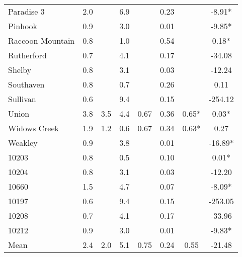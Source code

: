 \begin{tabular}{l c c c c c c c}
Paradise 3 & 2.0 &  & 6.9 &  & 0.23 &  & -8.91* \\
Pinhook & 0.9 &  & 3.0 &  & 0.01 &  & -9.85* \\
Raccoon Mountain & 0.8 &  & 1.0 &  & 0.54 &  & 0.18* \\
Rutherford & 0.7 &  & 4.1 &  & 0.17 &  & -34.08 \\
Shelby & 0.8 &  & 3.1 &  & 0.03 &  & -12.24 \\
Southaven & 0.8 &  & 0.7 &  & 0.26 &  & 0.11 \\
Sullivan & 0.6 &  & 9.4 &  & 0.15 &  & -254.12 \\
Union & 3.8 & 3.5 & 4.4 & 0.67 & 0.36 & 0.65* & 0.03* \\
Widows Creek & 1.9 & 1.2 & 0.6 & 0.67 & 0.34 & 0.63* & 0.27 \\
Weakley & 0.9 &  & 3.8 &  & 0.01 &  & -16.89* \\
10203 & 0.8 &  & 0.5 &  & 0.10 &  & 0.01* \\
10204 & 0.8 &  & 3.1 &  & 0.03 &  & -12.20 \\
10660 & 1.5 &  & 4.7 &  & 0.07 &  & -8.09* \\
10197 & 0.6 &  & 9.4 &  & 0.15 &  & -253.05 \\
10208 & 0.7 &  & 4.1 &  & 0.17 &  & -33.96 \\
10212 & 0.9 &  & 3.0 &  & 0.01 &  & -9.83* \\
\hline
Mean & 2.4 & 2.0 & 5.1 & 0.75 & 0.24 & 0.55 & -21.48 \\
\end{tabular}
